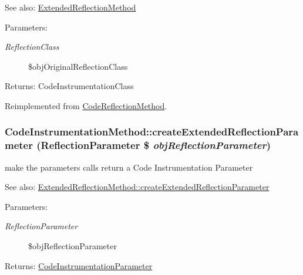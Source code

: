 \begin{Desc}
\item[See also:]\hyperlink{class_extended_reflection_method}{ExtendedReflectionMethod} \end{Desc}
\begin{Desc}
\item[Parameters:]
\begin{description}
\item[{\em ReflectionClass}]\$objOriginalReflectionClass \end{description}
\end{Desc}
\begin{Desc}
\item[Returns:]CodeInstrumentationClass \end{Desc}


Reimplemented from \hyperlink{class_code_reflection_method_84c20b140478480a3bbecda5e9e13702}{CodeReflectionMethod}.\hypertarget{class_code_instrumentation_method_d4a17b83d9e1fd997263bc1a9982ae3c}{
\subsubsection[{createExtendedReflectionParameter}]{\setlength{\rightskip}{0pt plus 5cm}CodeInstrumentationMethod::createExtendedReflectionParameter (ReflectionParameter \$ {\em objReflectionParameter})}}
\label{class_code_instrumentation_method_d4a17b83d9e1fd997263bc1a9982ae3c}


make the parameters calls return a Code Instrumentation Parameter

\begin{Desc}
\item[See also:]\hyperlink{class_extended_reflection_method_a7d2760c2914c0ad6428171c4ca61503}{ExtendedReflectionMethod::createExtendedReflectionParameter} \end{Desc}
\begin{Desc}
\item[Parameters:]
\begin{description}
\item[{\em ReflectionParameter}]\$objReflectionParameter \end{description}
\end{Desc}
\begin{Desc}
\item[Returns:]\hyperlink{class_code_instrumentation_parameter}{CodeInstrumentationParameter} \end{Desc}


